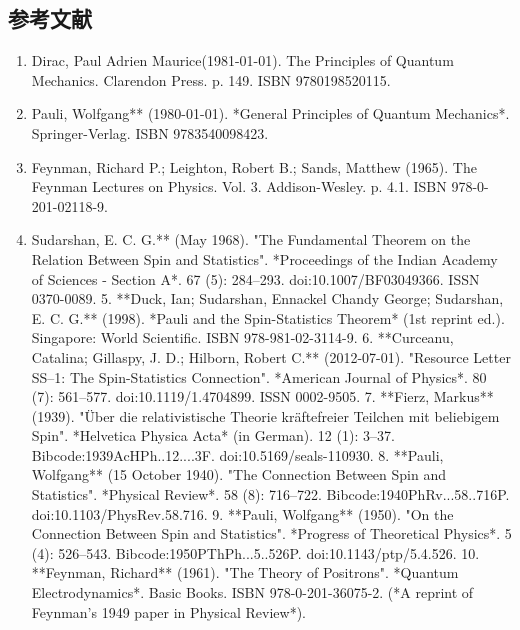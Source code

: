 \subsection{参考文献} 
\begin{enumerate}
\item Dirac, Paul Adrien Maurice(1981-01-01). The Principles of Quantum Mechanics. Clarendon Press. p. 149. ISBN 9780198520115.  
\item Pauli, Wolfgang** (1980-01-01). *General Principles of Quantum Mechanics*. Springer-Verlag. ISBN 9783540098423.  
\item Feynman, Richard P.; Leighton, Robert B.; Sands, Matthew (1965). The Feynman Lectures on Physics. Vol. 3. Addison-Wesley. p. 4.1. ISBN 978-0-201-02118-9.  
\item Sudarshan, E. C. G.** (May 1968). "The Fundamental Theorem on the Relation Between Spin and Statistics". *Proceedings of the Indian Academy of Sciences - Section A*. 67 (5): 284–293. doi:10.1007/BF03049366. ISSN 0370-0089.  
5. **Duck, Ian; Sudarshan, Ennackel Chandy George; Sudarshan, E. C. G.** (1998). *Pauli and the Spin-Statistics Theorem* (1st reprint ed.). Singapore: World Scientific. ISBN 978-981-02-3114-9.  
6. **Curceanu, Catalina; Gillaspy, J. D.; Hilborn, Robert C.** (2012-07-01). "Resource Letter SS–1: The Spin-Statistics Connection". *American Journal of Physics*. 80 (7): 561–577. doi:10.1119/1.4704899. ISSN 0002-9505.  
7. **Fierz, Markus** (1939). "Über die relativistische Theorie kräftefreier Teilchen mit beliebigem Spin". *Helvetica Physica Acta* (in German). 12 (1): 3–37. Bibcode:1939AcHPh..12....3F. doi:10.5169/seals-110930.  
8. **Pauli, Wolfgang** (15 October 1940). "The Connection Between Spin and Statistics". *Physical Review*. 58 (8): 716–722. Bibcode:1940PhRv...58..716P. doi:10.1103/PhysRev.58.716.  
9. **Pauli, Wolfgang** (1950). "On the Connection Between Spin and Statistics". *Progress of Theoretical Physics*. 5 (4): 526–543. Bibcode:1950PThPh...5..526P. doi:10.1143/ptp/5.4.526.  
10. **Feynman, Richard** (1961). "The Theory of Positrons". *Quantum Electrodynamics*. Basic Books. ISBN 978-0-201-36075-2. (*A reprint of Feynman's 1949 paper in Physical Review*).
\end{enumerate}